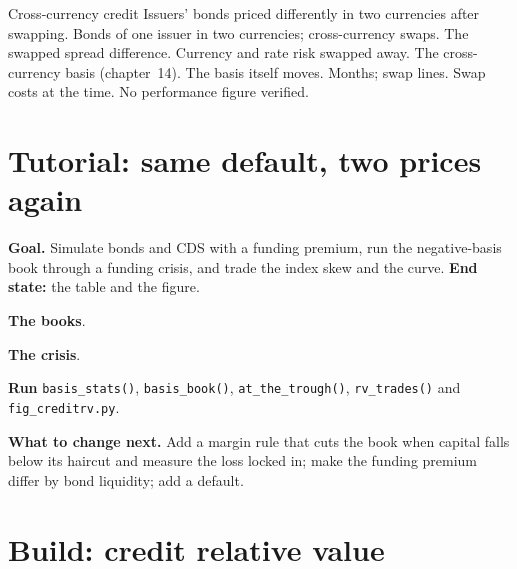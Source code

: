 \begin{strategyfile}{Cross-currency credit}\label{strat:s2:credit-relative-value:currency}
 Issuers' bonds priced differently in two currencies after swapping.
 Bonds of one issuer in two currencies; cross-currency swaps.
 The swapped spread difference.
 Currency and rate risk swapped away.
 The cross-currency basis (chapter~14).
 The basis itself moves.
 Months; swap lines.
 Swap costs at the time.
 No performance figure verified.
\end{strategyfile}

\section{Tutorial: same default, two prices again}\label{tut:s2:credit-relative-value:tut}

\begin{tutorial}
\textbf{Goal.} Simulate bonds and CDS with a funding premium, run the negative-basis book through a funding crisis, and trade the index skew and the
curve. \textbf{End state:} the table and the figure.
\begin{tutsteps}
\item \textbf{The books}.
\label{lst:s2:credit-relative-value:book}
\item \textbf{The crisis}.
\label{lst:s2:credit-relative-value:crisis}
\item \textbf{Run} \texttt{basis\_stats()}, \texttt{basis\_book()}, \texttt{at\_the\_trough()}, \texttt{rv\_trades()} and \texttt{fig\_creditrv.py}.
\end{tutsteps}
\textbf{What to change next.} Add a margin rule that cuts the book when capital falls below its haircut and measure the loss locked in; make the
funding premium differ by bond liquidity; add a default.
\end{tutorial}

\section{Build: credit relative value}\label{bld:s2:credit-relative-value:creditrv}

